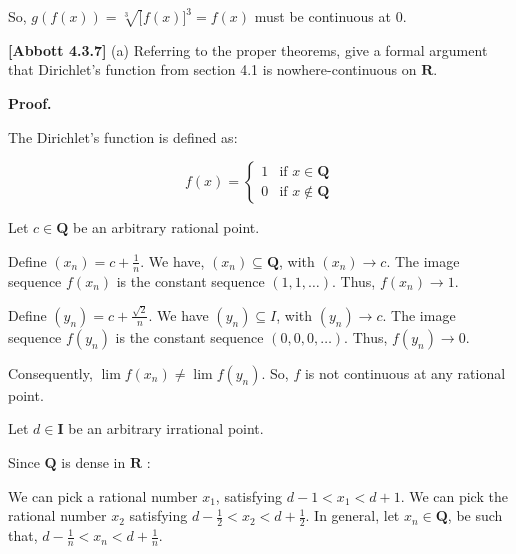 \documentclass[10pt]{article}
\begin{document}
So, $\displaystyle g( f( x)) =\sqrt[3] [ f( x)]^{3} =f( x)$ must be continuous at $\displaystyle 0$.



\textbf{[Abbott 4.3.7]} (a) Referring to the proper theorems, give a formal argument that Dirichlet's function from section 4.1 is nowhere-continuous on $\displaystyle \mathbf{R}$.



\textbf{Proof.}



The Dirichlet's function is defined as:




\begin{equation*}
f( x) =\begin{cases}
1 & \text{if } x\in \mathbf{Q}\\
0 & \text{if } x\notin \mathbf{Q}
\end{cases}
\end{equation*}


Let $\displaystyle c\in \mathbf{Q}$ be an arbitrary rational point.



Define $\displaystyle ( x_{n}) =c+\frac{1}{n}$. We have, $\displaystyle ( x_{n}) \subseteq \mathbf{Q}$, with $\displaystyle ( x_{n})\rightarrow c$. The image sequence $\displaystyle f( x_{n})$ is the constant sequence $\displaystyle ( 1,1,\dotsc )$. Thus, $\displaystyle f( x_{n})\rightarrow 1$.



Define $\displaystyle ( y_{n}) =c+\frac{\sqrt{2}}{n}$. We have $\displaystyle ( y_{n}) \subseteq I$, with $\displaystyle ( y_{n})\rightarrow c$. The image sequence $\displaystyle f( y_{n})$ is the constant sequence $\displaystyle ( 0,0,0,\dotsc )$. Thus, $\displaystyle f( y_{n})\rightarrow 0$.



Consequently, $\displaystyle \lim f( x_{n}) \neq \lim f( y_{n})$. So, $\displaystyle f$ is not continuous at any rational point.



Let $\displaystyle d\in \mathbf{I}$ be an arbitrary irrational point.



Since $\displaystyle \mathbf{Q}$ is dense in $\displaystyle \mathbf{R}$ :



We can pick a rational number $\displaystyle x_{1}$, satisfying $\displaystyle d-1< x_{1} < d+1$. We can pick the rational number $\displaystyle x_{2}$ satisfying $\displaystyle d-\frac{1}{2} < x_{2} < d+\frac{1}{2}$. In general, let $\displaystyle x_{n} \in \mathbf{Q}$, be such that, $\displaystyle d-\frac{1}{n} < x_{n} < d+\frac{1}{n}$.
\end{document}
